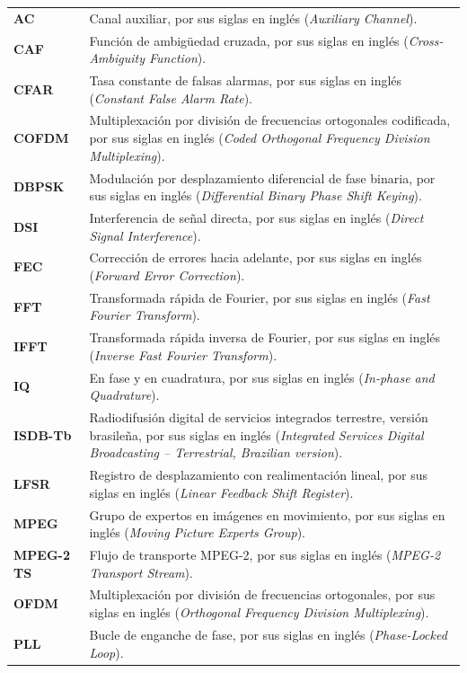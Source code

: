 \documentclass[12pt, letterpaper, oneside]{report}
\begin{document}
	\begin{longtable}{>{\bfseries}p{} p{}}
	AC    & Canal auxiliar, por sus siglas en inglés (\textit{Auxiliary Channel}).\\
	CAF   & Función de ambigüedad cruzada, por sus siglas en inglés (\textit{Cross-Ambiguity Function}).\\
	CFAR  & Tasa constante de falsas alarmas, por sus siglas en inglés (\textit{Constant False Alarm Rate}).\\
	COFDM & Multiplexación por división de frecuencias ortogonales codificada, por sus siglas en inglés (\textit{Coded Orthogonal Frequency Division Multiplexing}).\\
	DBPSK & Modulación por desplazamiento diferencial de fase binaria, por sus siglas en inglés (\textit{Differential Binary Phase Shift Keying}).\\
	DSI   & Interferencia de señal directa, por sus siglas en inglés (\textit{Direct Signal Interference}).\\
	FEC   & Corrección de errores hacia adelante, por sus siglas en inglés (\textit{Forward Error Correction}).\\
	FFT   & Transformada rápida de Fourier, por sus siglas en inglés (\textit{Fast Fourier Transform}).\\
	IFFT  & Transformada rápida inversa de Fourier, por sus siglas en inglés (\textit{Inverse Fast Fourier Transform}).\\
	IQ    & En fase y en cuadratura, por sus siglas en inglés (\textit{In-phase and Quadrature}).\\
	ISDB-Tb & Radiodifusión digital de servicios integrados terrestre, versión brasileña, por sus siglas en inglés (\textit{Integrated Services Digital Broadcasting -- Terrestrial, Brazilian version}).\\
	LFSR  & Registro de desplazamiento con realimentación lineal, por sus siglas en inglés (\textit{Linear Feedback Shift Register}).\\
	MPEG  & Grupo de expertos en imágenes en movimiento, por sus siglas en inglés (\textit{Moving Picture Experts Group}).\\
	MPEG-2 TS & Flujo de transporte MPEG-2, por sus siglas en inglés (\textit{MPEG-2 Transport Stream}).\\
	OFDM  & Multiplexación por división de frecuencias ortogonales, por sus siglas en inglés (\textit{Orthogonal Frequency Division Multiplexing}).\\
	PLL   & Bucle de enganche de fase, por sus siglas en inglés (\textit{Phase-Locked Loop}).\\

\end{longtable}
\end{document}
